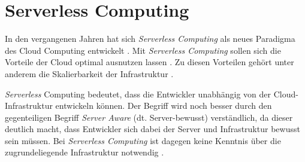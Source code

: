 \section{Serverless Computing} %
\label{sec:serverless-serveraware}





In den vergangenen Jahren hat sich \textit{Serverless Computing} als neues Paradigma des Cloud Computing entwickelt \cite[Vgl.][S. 44]{Castro2019}\cite[Vgl.][S. 64]{Anel2020}. Mit \textit{Serverless Computing} sollen sich die Vorteile der Cloud optimal ausnutzen lassen \cite[Vgl.][S. 6]{Eivy2017}\cite[Vgl.][S. 8]{Jonas2019}. Zu diesen Vorteilen gehört unter anderem die Skalierbarkeit der Infrastruktur \cite[Vgl.][S. 1ff]{Armbrust2009}\cite[Vgl.][S. 234]{Villamizar2017}\cite[Vgl.][S. 884]{Adzic2017}.

\textit{Serverless} Computing bedeutet, dass die Entwickler unabhängig von der Cloud-Infrastruktur entwickeln können. Der Begriff wird noch besser durch den gegenteiligen Begriff \textit{Server Aware} (dt. Server-bewusst) verständlich, da dieser deutlich macht, dass Entwickler sich dabei der Server und Infrastruktur bewusst sein müssen. Bei \textit{Serverless Computing} ist dagegen keine Kenntnis über die zugrundeliegende Infrastruktur notwendig \cite[Vgl.][S. 5]{Jonas2019}\cite[Vgl.][S. 1]{Hellerstein2018}\cite[Vgl.][S. 46]{Castro2019}\cite[Vgl.][S. 64]{Anel2020}.

